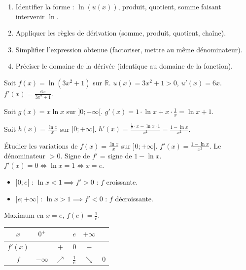 \documentclass[11pt]{article}
\begin{document}
\begin{methode}
\begin{enumerate}
    \item Identifier la forme : $\ln(u(x))$, produit, quotient, somme faisant intervenir $\ln$.
    \item Appliquer les règles de dérivation (somme, produit, quotient, chaîne).
    \item Simplifier l'expression obtenue (factoriser, mettre au même dénominateur).
    \item Préciser le domaine de la dérivée (identique au domaine de la fonction).
\end{enumerate}
\end{methode}

\begin{exoresolu}[Dérivation]
Soit $f(x) = \ln(3x^2 + 1)$ sur $\mathbb{R}$.
$u(x) = 3x^2+1 > 0$, $u'(x) = 6x$.
$f'(x) = \frac{6x}{3x^2+1}$.

Soit $g(x) = x \ln x$ sur $]0;+\infty[$.
$g'(x) = 1 \cdot \ln x + x \cdot \frac{1}{x} = \ln x + 1$.

Soit $h(x) = \frac{\ln x}{x}$ sur $]0;+\infty[$.
$h'(x) = \frac{\frac{1}{x} \cdot x - \ln x \cdot 1}{x^2} = \frac{1 - \ln x}{x^2}$.
\end{exoresolu}

\begin{exemplebox}
Étudier les variations de $f(x) = \frac{\ln x}{x}$ sur $]0;+\infty[$.
$f'(x) = \frac{1-\ln x}{x^2}$. Le dénominateur $>0$. Signe de $f'$ = signe de $1-\ln x$.
$f'(x) = 0 \iff \ln x = 1 \iff x = e$.
\begin{itemize}
    \item $]0;e[$ : $\ln x < 1 \implies f'>0$ : $f$ croissante.
    \item $]e;+\infty[$ : $\ln x > 1 \implies f'<0$ : $f$ décroissante.
\end{itemize}
Maximum en $x=e$, $f(e) = \frac{1}{e}$.
\begin{center}
\begin{tabular}{|c|ccccc|}\hline
$x$ & $0^+$ & & $e$ & $+\infty$ \\ \hline
$f'(x)$ & & $+$ & $0$ & $-$ \\ \hline
$f$ & $-\infty$ & $\nearrow$ & $\frac{1}{e}$ & $\searrow$ & $0$ \\ \hline
\end{tabular}
\end{center}
\end{exemplebox}
\end{document}
